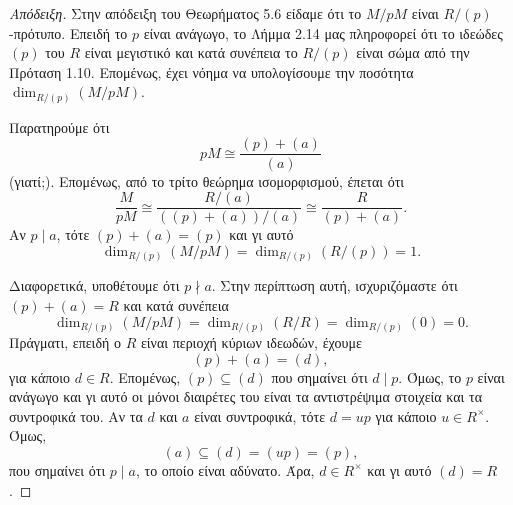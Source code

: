 \documentclass[12pt,a4paper,reqno]{amsart}
\theoremstyle{definition}
\theoremstyle{remark}
\numberwithin{theorem}{section}
\numberwithin{exercise}{section}
\numberwithin{equation}{section}
\begin{document}
\begin{proof}[Απόδειξη]
    Στην απόδειξη του Θεωρήματος 5.6 είδαμε ότι το $M/pM$ είναι $R/(p)$-πρότυπο. Επειδή το $p$ είναι ανάγωγο, το Λήμμα 2.14 μας πληροφορεί ότι το ιδεώδες $(p)$ του $R$ είναι μεγιστικό και κατά συνέπεια το $R/(p)$ είναι σώμα από την Πρόταση 1.10. Επομένως, έχει νόημα να υπολογίσουμε την ποσότητα $\dim_{R/(p)}\left(
        M/pM
    \right)$.

    Παρατηρούμε ότι 
    \[
    pM \cong \frac{(p) + (a)}{(a)}
    \]
    (γιατί;). Επομένως, από το τρίτο θεώρημα ισομορφισμού, έπεται ότι 
    \[
    \frac{M}{pM} \cong \frac{R/(a)}{\left((p) + (a)\right)/(a)} \cong \frac{R}{(p) + (a)}.
    \]
    Αν $p \mid a$, τότε $(p) + (a) = (p)$ και γι αυτό 
    \[
    \dim_{R/(p)}\left(
        M/pM
    \right) = \dim_{R/(p)}\left(
        R/(p)
    \right) = 1.
    \]

    Διαφορετικά, υποθέτουμε ότι $p \nmid a$. Στην περίπτωση αυτή, ισχυριζόμαστε ότι $(p) + (a) = R$ και κατά συνέπεια 
    \[
    \dim_{R/(p)}\left(
        M/pM
    \right) = \dim_{R/(p)}\left(
        R/R
    \right) = \dim_{R/(p)}(0) = 0.
    \]
    Πράγματι, επειδή ο $R$ είναι περιοχή κύριων ιδεωδών, έχουμε \[
    (p) + (a) = (d),
    \]
    για κάποιο $d \in R$. Επομένως, $(p) \subseteq (d)$ που σημαίνει ότι $d \mid p$. Όμως, το $p$ είναι ανάγωγο και γι αυτό οι μόνοι διαιρέτες του είναι τα αντιστρέψιμα στοιχεία και τα συντροφικά του. Αν τα $d$ και $a$ είναι συντροφικά, τότε $d = up$ για κάποιο $u \in R^\times$. Όμως, 
    \[
    (a) \subseteq (d) = (up) = (p),
    \] 
    που σημαίνει ότι $p \mid a$, το οποίο είναι αδύνατο. Άρα, $d \in R^\times$ και γι αυτό $(d) = R$.
\end{proof}
\end{document}
